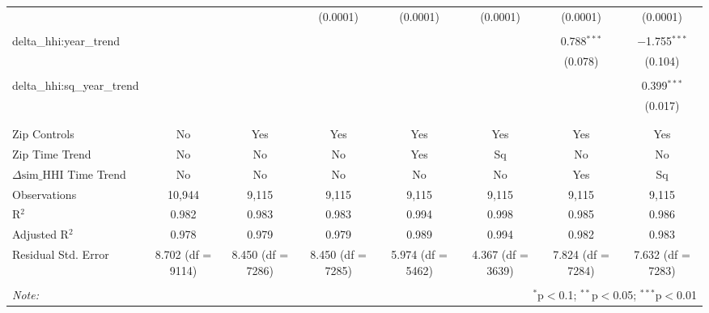 \begin{table}[H]
{\begin{tabular}{@{\extracolsep{5pt}}lccccccc}
   &  &  & (0.0001) & (0.0001) & (0.0001) & (0.0001) & (0.0001) \\  

   & & & & & & & \\  

  delta\_hhi:year\_trend &  &  &  &  &  & 0.788$^{***}$ & $-$1.755$^{***}$ \\  

   &  &  &  &  &  & (0.078) & (0.104) \\  

   & & & & & & & \\  

  delta\_hhi:sq\_year\_trend &  &  &  &  &  &  & 0.399$^{***}$ \\  

   &  &  &  &  &  &  & (0.017) \\  

   & & & & & & & \\  

 \hline \\[-1.8ex]  

 Zip Controls & No & Yes & Yes & Yes & Yes & Yes & Yes \\  

 Zip Time Trend & No & No & No & Yes & Sq & No & No \\  

 $\Delta \text{sim\_HHI}$ Time Trend & No & No & No & No & No & Yes & Sq \\  

 Observations & 10,944 & 9,115 & 9,115 & 9,115 & 9,115 & 9,115 & 9,115 \\  

 R$^{2}$ & 0.982 & 0.983 & 0.983 & 0.994 & 0.998 & 0.985 & 0.986 \\  

 Adjusted R$^{2}$ & 0.978 & 0.979 & 0.979 & 0.989 & 0.994 & 0.982 & 0.983 \\  

 Residual Std. Error & 8.702 (df = 9114) & 8.450 (df = 7286) & 8.450 (df = 7285) & 5.974 (df = 5462) & 4.367 (df = 3639) & 7.824 (df = 7284) & 7.632 (df = 7283) \\  

 \hline  

 \hline \\[-1.8ex]  

 \textit{Note:}  & \multicolumn{7}{r}{$^{*}$p$<$0.1; $^{**}$p$<$0.05; $^{***}$p$<$0.01} \\  

 \end{tabular}}  

 \end{table}  

